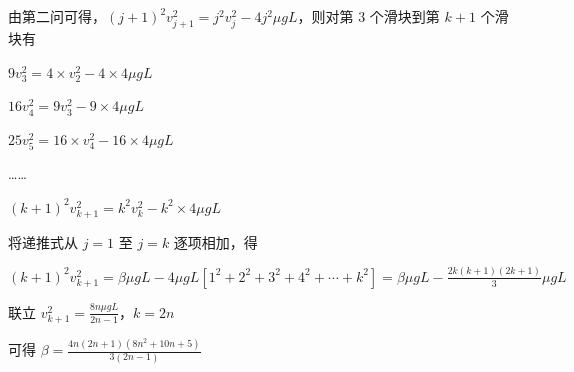 \documentclass[\gkver]{gaokaozhenti}
\begin{document}
\begin{enumerate}
{\begin{enumerate}
	由第二问可得，$(j+1)^{2} v_{j+1}^{2} = j^{2} v_{j}^{2} - 4j^{2}\mu gL$，则对第 3 个滑块到第 $k+1$ 个滑块有

	$9v_{3}^{2} = 4 \times v_{2}^{2} - 4 \times 4\mu gL$

	$16v_{4}^{2} = 9v_{3}^{2} - 9 \times 4\mu gL$

	$25v_{5}^{2} = 16 \times v_{4}^{2} - 16 \times 4\mu gL$

	……

	$(k+1)^{2} v_{k+1}^{2} = k^{2} v_{k}^{2} - k^{2} \times 4\mu gL$

	将递推式从 $j=1$ 至 $j=k$ 逐项相加，得

	$(k+1)^{2} v_{k+1}^{2} = \beta\mu gL - 4\mu gL \left[1^{2} + 2^{2} + 3^{2} + 4^{2} + \cdots + k^{2}\right] = \beta\mu gL - \frac{2k(k+1)(2k+1)}{3}\mu gL$

	联立 $v_{k+1}^{2} = \frac{8n\mu gL}{2n-1}$，$k = 2n$

	可得 $\beta = \frac{4n(2n+1)(8n^{2} + 10n+5)}{3(2n-1)}$
\end{enumerate}
}

\end{enumerate}
\end{document}
